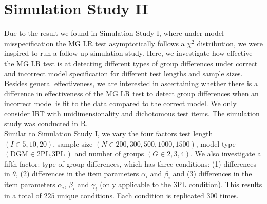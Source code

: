 \documentclass[Royal,sageapa,times,doublespace]{sagej}
\begin{document}
\section{Simulation Study II}
Due to the result we found in Simulation Study I, where under model misspecification the MG LR test asymptotically follows a $\chi^2$ distribution, we were inspired to run a follow-up simulation study. Here, we investigate how effective the MG LR test is at detecting different types of group differences under correct and incorrect model specification for different test lengths and sample sizes. Besides general effectiveness, we are interested in ascertaining whether there is a difference in effectiveness of the MG LR test to detect group differences when an incorrect model is fit to the data compared to the correct model. We only consider IRT with unidimensionality and dichotomous test items. The simulation study was conducted in R. \\
\indent Similar to Simulation Study I, we vary the four factors test length $(I \in{5, 10, 20})$, sample size $(N \in{200, 300, 500, 1000, 1500})$, model type $(\text{DGM} \in{\text{2PL}, \text{3PL}})$ and number of groups $(G \in{2, 3, 4})$. We also investigate a fifth factor: type of group differences, which has three conditions: (1) differences in $\theta$, (2) differences in the item parameters $\alpha_i$ and $\beta_i$ and (3) differences in the item parameters $\alpha_i$, $\beta_i$ and $\gamma_i$ (only applicable to the 3PL condition). This results in a total of $225$ unique conditions. Each condition is replicated $300$ times. \\
\end{document}
